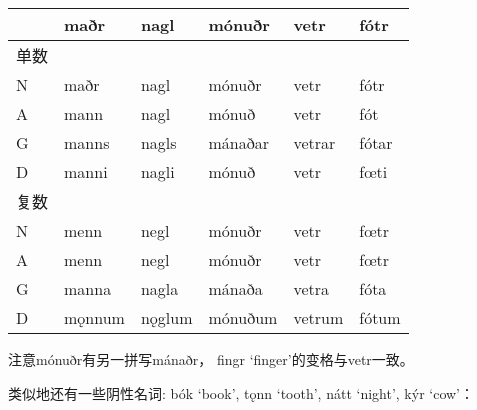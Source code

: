 \begin{longtable}{llllll}
  \toprule
       & \textbf{maðr} & \textbf{nagl} & \textbf{mónuðr} & \textbf{vetr} & \textbf{fótr} \\
  \midrule
  \endhead
  \bottomrule
  \endfoot
  单数 &               &               &                 &               &               \\
  N    & maðr          & nagl          & mónuðr          & vetr          & fótr          \\
  A    & mann          & nagl          & mónuð           & vetr          & fót           \\
  G    & manns         & nagls         & mánaðar         & vetrar        & fótar         \\
  D    & manni         & nagli         & mónuð           & vetr          & fœti          \\
  复数 &               &               &                 &               &               \\
  N    & menn          & negl          & mónuðr          & vetr          & fœtr          \\
  A    & menn          & negl          & mónuðr          & vetr          & fœtr          \\
  G    & manna         & nagla         & mánaða          & vetra         & fóta          \\
  D    & mǫnnum        & nǫglum        & mónuðum         & vetrum        & fótum         \\
\end{longtable}

注意mónuðr有另一拼写mánaðr， fingr `finger‌'的变格与vetr一致。

类似地还有一些阴性名词: bók `book', tǫnn `tooth', nátt `night', kýr
`cow'：

